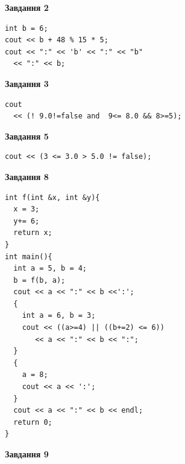 \documentclass[12pt, ukrainian]{article}
\begin{document}
{\begin {large}
\begin{minipage}[t]{7.0cm}
\end{minipage}
\vline \hspace{1mm}
\begin{minipage}[t]{11.0cm}

\begin{center}
\textbf{Завдання 2}
\end{center}
\vspace{-8mm}

\begin{verbatim}
int b = 6;
cout << b + 48 % 15 * 5;
cout << ":" << 'b' << ":" << "b" 
  << ":" << b;
\end{verbatim}



\begin{center}
\textbf{Завдання 3}
\end{center}
\vspace{-8mm}

\begin{verbatim}
cout 
  << (! 9.0!=false and  9<= 8.0 && 8>=5);
\end{verbatim}



\begin{center}
\textbf{Завдання 5}
\end{center}
\vspace{-8mm}

\begin{verbatim}
cout << (3 <= 3.0 > 5.0 != false);
\end{verbatim}



\begin{center}
\textbf{Завдання 8}
\end{center}
\vspace{-8mm}

\begin{verbatim}
int f(int &x, int &y){
  x = 3;
  y+= 6;
  return x;
}
int main(){
  int a = 5, b = 4;
  b = f(b, a);
  cout << a << ":" << b <<':';
  {
    int a = 6, b = 3;
    cout << ((a>=4) || ((b+=2) <= 6))
       << a << ":" << b << ":";
  }
  {
    a = 8;
    cout << a << ':';
  }
  cout << a << ":" << b << endl;
  return 0;
}
\end{verbatim}

\end{minipage}


\begin{minipage}[t]{7.0cm}

\begin{center}
\textbf{Завдання 9}
\end{center}
\vspace{-8mm}


\end{minipage}
\end{large}}
\end{document}
